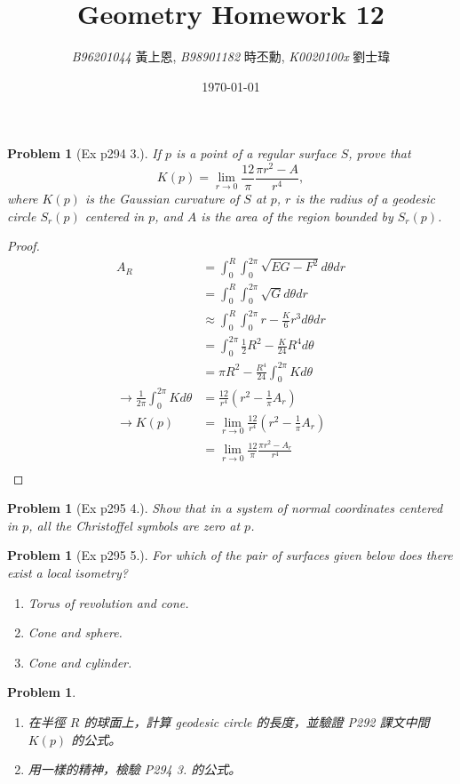 \documentclass[10pt,a4paper]{article}
\newcommand{\LiHei}{\CJKfamily{lh}}
\newcounter{theProblemCounter}
\newtheorem{problem}[theProblemCounter]{Problem}
\begin{document}
\title{{Geometry Homework 12}}
\author{{\it{B96201044}} {\LiHei 黃上恩}, {\it{B98901182}} {\LiHei 時丕勳}, {\it{K0020100x}} {\LiHei 劉士瑋}}
\date{\today}
\maketitle

\newcommand{\bx}{\mathbb{X}}
\newcommand{\bfx}{\mathbf{x}}
\newcommand{\grad}{\textrm{grad }}
\newcommand{\sech}{\mbox{sech}}

\setcounter{theProblemCounter}{2}
\begin{problem}[Ex p294 3.]
If $p$ is a point of a regular surface $S$, prove that \[ K(p) = \lim_{r\to 0}\frac{12}{\pi}\frac{\pi r^2-A}{r^4}, \] where $K(p)$ is the Gaussian curvature of $S$ at $p$, $r$ is the radius of a geodesic circle $S_r(p)$ centered in $p$, and $A$ is the area of the region bounded by $S_r(p)$.
\end{problem}
\begin{proof}
\begin{align*}
A_R&=\int_{0}^{R}\int_0^{2\pi}\sqrt{EG-F^2}d\theta dr\\
&=\int_{0}^{R}\int_0^{2\pi}\sqrt{G}d\theta dr\\
&\approx \int_{0}^{R}\int_0^{2\pi} r-\frac{K}{6}r^3 d\theta dr\\
&=\int_0^{2\pi}\frac{1}{2}R^2-\frac{K}{24}R^4 d\theta\\
&=\pi R^2-\frac{R^4}{24}\int_0^{2\pi}K d\theta\\
\rightarrow \frac{1}{2\pi}\int_0^{2\pi}K d\theta &=\frac{12}{r^4}(r^2-\frac{1}{\pi}A_r)\\
\rightarrow K(p)&=\lim_{r\to 0}\frac{12}{r^4}(r^2-\frac{1}{\pi}A_r)\\
&=\lim_{r\to 0}\frac{12}{\pi}\frac{\pi r^2-A_r}{r^4}\\
\end{align*}
\end{proof}

\setcounter{theProblemCounter}{3}
\begin{problem}[Ex p295 4.]
Show that in a system of normal coordinates centered in $p$, all the Christoffel symbols are zero at $p$.
\end{problem}

\setcounter{theProblemCounter}{4}
\begin{problem}[Ex p295 5.]
For which of the pair of surfaces given below does there exist a local isometry?
\begin{enumerate}
\item[(a)] Torus of revolution and cone.
\item[(b)] Cone and sphere.
\item[(c)] Cone and cylinder.
\end{enumerate}
\end{problem}

\setcounter{theProblemCounter}{7}
\begin{problem}\hspace*{1em}
\begin{enumerate}
\item[(a)] 在半徑 $R$ 的球面上，計算 geodesic circle 的長度，並驗證 P292 課文中間 $K(p)$ 的公式。
\item[(b)] 用一樣的精神，檢驗 P294 3. 的公式。
\end{enumerate}
\end{problem}
\end{document}
